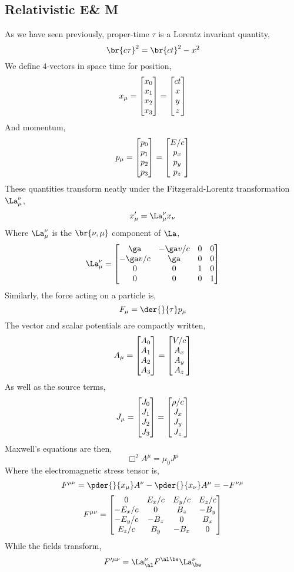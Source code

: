 \documentclass{article}
\begin{document}
\subsection{Relativistic E\& M}
As we have seen previously, proper-time $\tau$ is a Lorentz invariant quantity,
\[ \br{c\tau}^2 = \br{c t}^2 - x^2 \]
We define $4$-vectors in space time for position,
\[ x_{\mu} = \begin{bmatrix}x_0 \\ x_1 \\ x_2 \\ x_3\end{bmatrix} = \begin{bmatrix}ct \\ x \\ y \\ z\end{bmatrix} \]
And momentum,
\[ p_{\mu} = \begin{bmatrix}p_0 \\ p_1 \\ p_2 \\ p_3\end{bmatrix} = \begin{bmatrix}E/c \\ p_x \\ p_y \\ p_z\end{bmatrix} \]
These quantities transform neatly under the Fitzgerald-Lorentz transformation $\La_{\mu}^{\nu}$,
\[ x'_{\mu} = \La_{\mu}^{\nu} x_\nu \]
Where $\La_{\mu}^{\nu}$ is the $\br{\nu, \mu}$ component of $\La$,
\[ \La_{\mu}^{\nu} = \sqm{\ga & -\ga v/c & 0 & 0 \\- \ga v/c & \ga & 0 & 0 \\0 & 0 & 1 & 0 \\0 & 0 & 0 & 1 } \]
Similarly, the force acting on a particle is,
\[ F_{\mu} = \der{}{\tau} p_{\mu} \]
The vector and scalar potentials are compactly written,
\[ A_{\mu} = \begin{bmatrix}A_0 \\ A_1 \\ A_2 \\ A_3\end{bmatrix} = \begin{bmatrix}V/c \\ A_x \\ A_y \\ A_z\end{bmatrix} \]
As well as the source terms,
\[ J_{\mu} = \begin{bmatrix}J_0 \\ J_1 \\ J_2 \\ J_3\end{bmatrix} = \begin{bmatrix}\rho/c \\ J_x \\ J_y \\ J_z\end{bmatrix} \]
Maxwell's equations are then,
\[ \Box^2 A^{\mu} = \mu_0 J^{\mu} \]
Where the electromagnetic stress tensor is,
\[ F^{\mu\nu} = \pder{}{x_{\mu}} A^{\nu} - \pder{}{x_{\nu}} A^{\mu} = - F^{\nu \mu}\]
\[ F^{\mu\nu} = \begin{bmatrix}0 & E_x/c & E_y/c & E_z/c \\ -E_x/c & 0 & B_z & -B_y \\ -E_y/c & -B_z & 0 & B_x \\ E_z/c & B_y & -B_x & 0\end{bmatrix} \]
While the fields transform,
\[ F'^{\mu\nu} = \La_{\al}^{\mu} F^{\al\be} \La_{\be}^{\nu} \]
\end{document}
